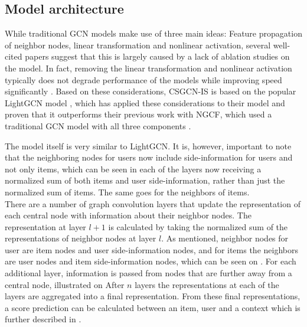 \subsection{Model architecture}\label{subsec:csgcn_is_model_architecture}
While traditional GCN models make use of three main ideas: Feature propagation of neighbor nodes, linear transformation and nonlinear activation, several well-cited papers \cite{SimplifyingGCN,LightGCN,HeteGCN} suggest that this is largely caused by a lack of ablation studies on the model.
In fact, removing the linear transformation and nonlinear activation typically does not degrade performance of the models while improving speed significantly \cite{SimplifyingGCN}.
Based on these considerations, CSGCN-IS is based on the popular LightGCN model \cite{LightGCN}, which has applied these considerations to their model and proven that it outperforms their previous work with NGCF, which used a traditional GCN model with all three components \cite{LightGCN}.

The model itself is very similar to LightGCN.
It is, however, important to note that the neighboring nodes for users now include side-information for users and not only items, which can be seen in each of the layers now receiving a normalized sum of both items and user side-information, rather than just the normalized sum of items.
The same goes for the neighbors of items.
\\
There are a number of graph convolution layers that update the representation of each central node with information about their neighbor nodes.
The representation at layer $l+1$ is calculated by taking the normalized sum of the representations of neighbor nodes at layer $l$. 
As mentioned, neighbor nodes for user are item nodes and user side-information nodes, and for items the neighbors are user nodes and item side-information nodes, which can be seen on .
For each additional layer, information is passed from nodes that are further away from a central node, illustrated on 
After $n$ layers the representations at each of the layers are aggregated into a final representation.
From these final representations, a score prediction can be calculated between an item, user and a context which is further described in .



